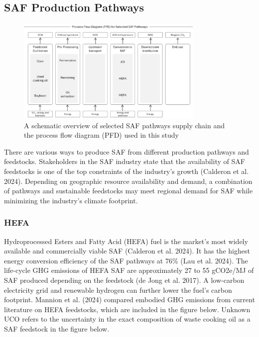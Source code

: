 \documentclass[12pt]{article}
\begin{document}
\begin{Appendix}
\subsection{SAF Production Pathways}

\begin{figure}[H]
\centering
\includegraphics[width=0.8\textwidth]{Fig 2.png} %
\caption{A schematic overview of selected SAF pathways supply chain and the process flow diagram (PFD) used in this study}
\label{fig:figure 2}
\end{figure}

There are various ways to produce SAF from different production pathways and feedstocks. Stakeholders in the SAF industry state that the availability of SAF feedstocks is one of the top constraints of the industry’s growth (Calderon et al. 2024). Depending on geographic resource availability and demand, a combination of pathways and sustainable feedstocks may meet regional demand for SAF while minimizing the industry’s climate footprint.

\subsubsection{HEFA}

Hydroprocessed Esters and Fatty Acid (HEFA) fuel is the market's most widely available and commercially viable SAF (Calderon et al. 2024). It has the highest energy conversion efficiency of the SAF pathways at 76\% (Lau et al. 2024). The life-cycle GHG emissions of HEFA SAF are approximately 27 to 55 gCO2e/MJ of SAF produced depending on the feedstock (de Jong et al. 2017). A low-carbon electricity grid and renewable hydrogen can further lower the fuel's carbon footprint. Mannion et al. (2024) compared embodied GHG emissions from current literature on HEFA feedstocks, which are included in the figure below. Unknown UCO refers to the uncertainty in the exact composition of waste cooking oil as a SAF feedstock in the figure below. 


\end{Appendix}
\end{document}
